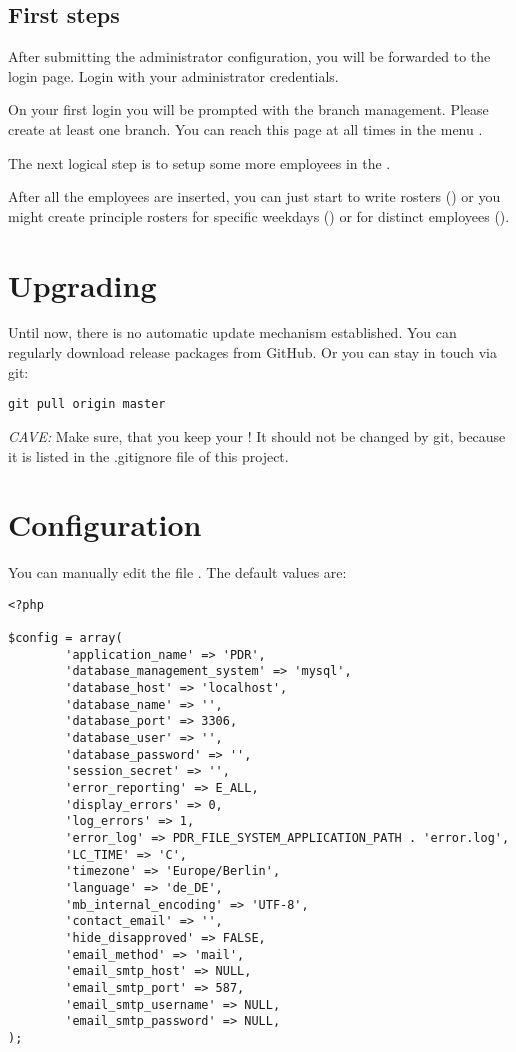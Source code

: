 \subsection{First steps}
After submitting the administrator configuration, you will be forwarded to the login page.
Login with your administrator credentials.

On your first login you will be prompted with the branch management. 
Please create at least one branch. You can reach this page at all times in the menu .

The next logical step is to setup some more employees in the .

After all the employees are inserted, you can just start to write rosters () or you might create principle rosters for specific weekdays () or for distinct employees ().


\section{Upgrading}
Until now, there is no automatic update mechanism established.
You can regularly download release packages from GitHub. Or you can stay in touch via git:
\begin{lstlisting}
git pull origin master
\end{lstlisting}
\emph{CAVE:} Make sure, that you keep your ! It should not be changed by git, because it is listed in the .gitignore file of this project.


\section{Configuration}
You can manually edit the file .
The default values are:
\begin{lstlisting}
<?php

$config = array(
        'application_name' => 'PDR',
        'database_management_system' => 'mysql',
        'database_host' => 'localhost',
        'database_name' => '',
        'database_port' => 3306,
        'database_user' => '',
        'database_password' => '',
        'session_secret' => '',
        'error_reporting' => E_ALL,
        'display_errors' => 0,
        'log_errors' => 1,
        'error_log' => PDR_FILE_SYSTEM_APPLICATION_PATH . 'error.log',
        'LC_TIME' => 'C',
        'timezone' => 'Europe/Berlin',
        'language' => 'de_DE',
        'mb_internal_encoding' => 'UTF-8',
        'contact_email' => '',
        'hide_disapproved' => FALSE,
        'email_method' => 'mail',
        'email_smtp_host' => NULL,
        'email_smtp_port' => 587,
        'email_smtp_username' => NULL,
        'email_smtp_password' => NULL,
);
\end{lstlisting}


